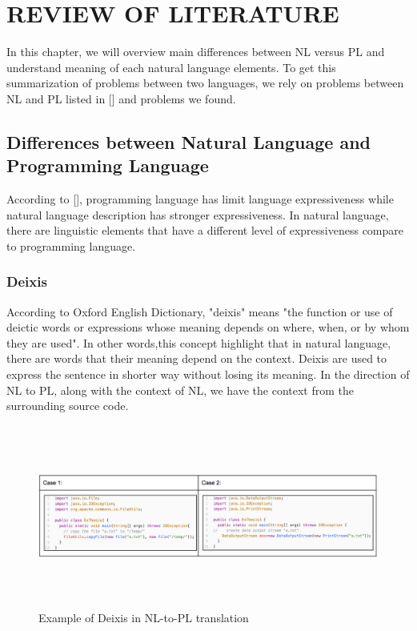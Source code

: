 \chapter{REVIEW OF LITERATURE}
In this chapter, we will overview main differences between NL versus PL and understand meaning of each natural language elements. To get this summarization of problems between two languages, we rely on problems between NL and PL listed in [\cite{Pulido-Prieto:2017:SNP:3145473.3109481}] and problems we found.
\section{Differences between Natural Language and Programming Language}
According to [\cite{Pulido-Prieto:2017:SNP:3145473.3109481}], programming language has limit language expressiveness while natural language description has stronger expressiveness.  In natural language, there are linguistic elements that have a different level of expressiveness compare to programming language.
\subsection{Deixis}
According to Oxford English Dictionary, "deixis" means "the function or use of deictic words or expressions whose meaning depends on where, when, or by whom they are used". In other words,this concept highlight that in natural language, there are words that their meaning depend on the context. Deixis are used to express the sentence in  shorter way without losing its meaning. In the direction of NL to PL, along with the context of NL, we have the context from the surrounding source code. \\

\begin{figure}[htp]
	\centering
	\includegraphics[width=17cm,height=6cm]{resources/fig_deixis_example.png}%
	\caption[Example of Deixis in NL-to-PL translation]{Example of Deixis in NL-to-PL translation} 
	\label{fig:DeixisExample}
\end{figure}

